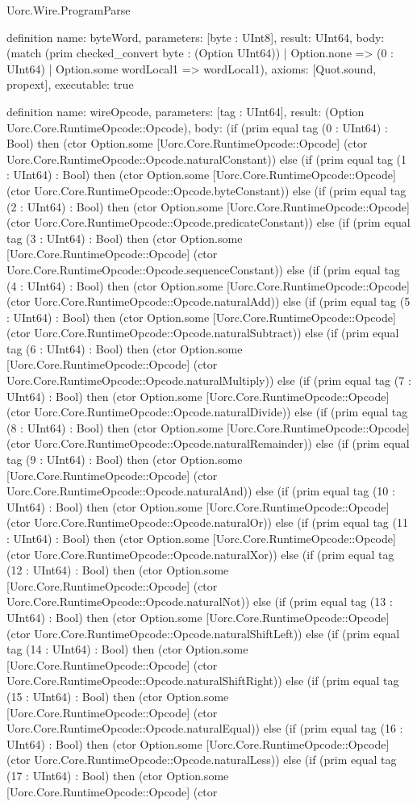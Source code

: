 \begin{lexlean}{Uorc.Wire.ProgramParse}
\begin{semanticmodule}
definition{
  name: byteWord,
  parameters: [byte : UInt8],
  result: UInt64,
  body: (match (prim checked_convert byte : (Option UInt64))
    | Option.none => (0 : UInt64)
    | Option.some wordLocal1 => wordLocal1),
  axioms: [Quot.sound, propext],
  executable: true
}

definition{
  name: wireOpcode,
  parameters: [tag : UInt64],
  result: (Option Uorc.Core.RuntimeOpcode::Opcode),
  body: (if (prim equal tag (0 : UInt64) : Bool) then (ctor Option.some [Uorc.Core.RuntimeOpcode::Opcode] (ctor Uorc.Core.RuntimeOpcode::Opcode.naturalConstant)) else (if (prim equal tag (1 : UInt64) : Bool) then (ctor Option.some [Uorc.Core.RuntimeOpcode::Opcode] (ctor Uorc.Core.RuntimeOpcode::Opcode.byteConstant)) else (if (prim equal tag (2 : UInt64) : Bool) then (ctor Option.some [Uorc.Core.RuntimeOpcode::Opcode] (ctor Uorc.Core.RuntimeOpcode::Opcode.predicateConstant)) else (if (prim equal tag (3 : UInt64) : Bool) then (ctor Option.some [Uorc.Core.RuntimeOpcode::Opcode] (ctor Uorc.Core.RuntimeOpcode::Opcode.sequenceConstant)) else (if (prim equal tag (4 : UInt64) : Bool) then (ctor Option.some [Uorc.Core.RuntimeOpcode::Opcode] (ctor Uorc.Core.RuntimeOpcode::Opcode.naturalAdd)) else (if (prim equal tag (5 : UInt64) : Bool) then (ctor Option.some [Uorc.Core.RuntimeOpcode::Opcode] (ctor Uorc.Core.RuntimeOpcode::Opcode.naturalSubtract)) else (if (prim equal tag (6 : UInt64) : Bool) then (ctor Option.some [Uorc.Core.RuntimeOpcode::Opcode] (ctor Uorc.Core.RuntimeOpcode::Opcode.naturalMultiply)) else (if (prim equal tag (7 : UInt64) : Bool) then (ctor Option.some [Uorc.Core.RuntimeOpcode::Opcode] (ctor Uorc.Core.RuntimeOpcode::Opcode.naturalDivide)) else (if (prim equal tag (8 : UInt64) : Bool) then (ctor Option.some [Uorc.Core.RuntimeOpcode::Opcode] (ctor Uorc.Core.RuntimeOpcode::Opcode.naturalRemainder)) else (if (prim equal tag (9 : UInt64) : Bool) then (ctor Option.some [Uorc.Core.RuntimeOpcode::Opcode] (ctor Uorc.Core.RuntimeOpcode::Opcode.naturalAnd)) else (if (prim equal tag (10 : UInt64) : Bool) then (ctor Option.some [Uorc.Core.RuntimeOpcode::Opcode] (ctor Uorc.Core.RuntimeOpcode::Opcode.naturalOr)) else (if (prim equal tag (11 : UInt64) : Bool) then (ctor Option.some [Uorc.Core.RuntimeOpcode::Opcode] (ctor Uorc.Core.RuntimeOpcode::Opcode.naturalXor)) else (if (prim equal tag (12 : UInt64) : Bool) then (ctor Option.some [Uorc.Core.RuntimeOpcode::Opcode] (ctor Uorc.Core.RuntimeOpcode::Opcode.naturalNot)) else (if (prim equal tag (13 : UInt64) : Bool) then (ctor Option.some [Uorc.Core.RuntimeOpcode::Opcode] (ctor Uorc.Core.RuntimeOpcode::Opcode.naturalShiftLeft)) else (if (prim equal tag (14 : UInt64) : Bool) then (ctor Option.some [Uorc.Core.RuntimeOpcode::Opcode] (ctor Uorc.Core.RuntimeOpcode::Opcode.naturalShiftRight)) else (if (prim equal tag (15 : UInt64) : Bool) then (ctor Option.some [Uorc.Core.RuntimeOpcode::Opcode] (ctor Uorc.Core.RuntimeOpcode::Opcode.naturalEqual)) else (if (prim equal tag (16 : UInt64) : Bool) then (ctor Option.some [Uorc.Core.RuntimeOpcode::Opcode] (ctor Uorc.Core.RuntimeOpcode::Opcode.naturalLess)) else (if (prim equal tag (17 : UInt64) : Bool) then (ctor Option.some [Uorc.Core.RuntimeOpcode::Opcode] (ctor }
\end{semanticmodule}
\end{lexlean}
